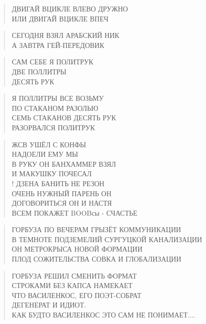 \poemtitle{***}
\begin{verse}
ДВИГАЙ ВЦИКЛЕ ВЛЕВО ДРУЖНО\\
ИЛИ ДВИГАЙ ВЦИКЛЕ ВПЕЧ
\end{verse}

\poemtitle{***}
\begin{verse}
СЕГОДНЯ ВЗЯЛ АРАБСКИЙ НИК\\
А ЗАВТРА ГЕЙ-ПЕРЕДОВИК
\end{verse}

\poemtitle{***}
\begin{verse}
САМ СЕБЕ Я ПОЛИТРУК\\
ДВЕ ПОЛЛИТРЫ\\
ДЕСЯТЬ РУК
\end{verse}

\poemtitle{***}
\begin{verse}
Я ПОЛЛИТРЫ ВСЕ ВОЗЬМУ\\
ПО СТАКАНОМ РАЗОЛЬЮ\\
СЕМЬ СТАКАНОВ ДЕСЯТЬ РУК\\
РАЗОРВАЛСЯ ПОЛИТРУК
\end{verse}

\poemtitle{***}
\begin{verse}
ЖСВ УШЁЛ С КОНФЫ \\
НАДОЕЛИ ЕМУ МЫ\\
В РУКУ ОН БАНХАММЕР ВЗЯЛ\\
И МАКУШКУ ПОЧЕСАЛ\\!
ДЗЕНА БАНИТЬ НЕ РЕЗОН\\
ОЧЕНЬ НУЖНЫЙ ПАРЕНЬ ОН\\
ДОГОВОРИТЬСЯ ОН И НАСТЯ\\
ВСЕМ ПОКАЖЕТ BOOBсы - СЧАСТЬЕ
\end{verse}

\poemtitle{***}
\begin{verse}
ГОРБУЗА ПО ВЕЧЕРАМ ГРЫЗЁТ КОММУНИКАЦИИ\\
В ТЕМНОТЕ ПОДЗЕМЕЛИЙ СУРГУЦКОЙ КАНАЛИЗАЦИИ\\
ОН МЕТРОКРЫСА НОВОЙ ФОРМАЦИИ\\
ПЛОД СОЖИТЕЛЬСТВА СОВКА И ГЛОБАЛИЗАЦИИ
\end{verse}

\poemtitle{***}
\begin{verse}
ГОРБУЗА РЕШИЛ СМЕНИТЬ ФОРМАТ\\
СТРОКАМИ БЕЗ КАПСА НАМЕКАЕТ\\
ЧТО ВАСИЛЕНКОС, ЕГО ПОЭТ-СОБРАТ\\
ДЕГЕНЕРАТ И ИДИОТ. \\
КАК БУДТО ВАСИЛЕНКОС ЭТО САМ НЕ ПОНИМАЕТ....
\end{verse}

